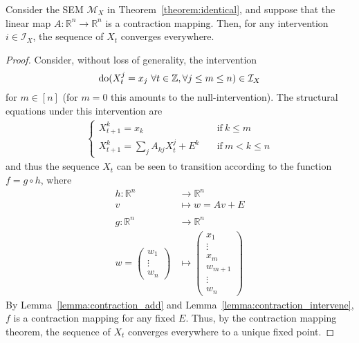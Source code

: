 \begin{lemma}\label{lemma:contraction_convergence}
Consider the SEM $\mathcal{M}_X$ in Theorem~\ref{theorem:identical}, and suppose that the linear map $A:\mathbb{R}^n \to \mathbb{R}^n$ is a contraction mapping.
Then, for any intervention $i\in\mathcal{I}_X$, the sequence of $X_t$ converges everywhere.
\end{lemma}
%
\begin{proof}
Consider, without loss of generality, the intervention
\[ \operatorname{do}(X_t^j=x_j\ \forall t\in\mathbb{Z},\forall j \leq m \leq n) \in \mathcal{I}_X \]
for $m \in [n]$ (for $m=0$ this amounts to the null-intervention).
The structural equations under this intervention are
\begin{align*}
\begin{cases}
X^k_{t+1} = x_k \quad &\text{if} \:  k \leq m \\
X^k_{t+1} = \sum_j A_{kj}X^j_{t} + E^k  \quad &\text{if} \: m < k \leq n
\end{cases}
\end{align*}
and thus the sequence $X_t$ can be seen to transition according to the function $f = g\circ h$, where
\begin{align*}
    h: \mathbb{R}^n &\to \mathbb{R}^n \\
    v &\mapsto w = Av + E \\
    \\
    g : \mathbb{R}^n &\to \mathbb{R}^n \\
    w = \begin{pmatrix}w_1\\\vdots\\w_n\end{pmatrix} &\mapsto
    \begin{pmatrix} x_1\\\vdots\\x_m\\w_{m+1}\\\vdots\\w_n \end{pmatrix}
\end{align*}
By Lemma~\ref{lemma:contraction_add} and Lemma~\ref{lemma:contraction_intervene}, $f$ is a contraction mapping for any fixed $E$.
Thus, by the contraction mapping theorem, the sequence of $X_t$ converges everywhere to a unique fixed point.
\end{proof}
